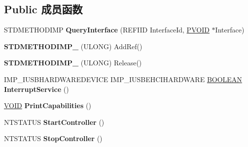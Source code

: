 \subsection*{Public 成员函数}
\begin{DoxyCompactItemize}
\item 
\mbox{\label{class_c_u_s_b_hardware_device_add03c1ce4739d30eb3120b009009b1ad}} 
S\+T\+D\+M\+E\+T\+H\+O\+D\+I\+MP {\bfseries Query\+Interface} (R\+E\+F\+I\+ID Interface\+Id, \hyperlink{interfacevoid}{P\+V\+O\+ID} $\ast$Interface)
\item 
\mbox{\label{class_c_u_s_b_hardware_device_a64dbb65e59d97d17de77e02c4d692bdb}} 
{\bfseries S\+T\+D\+M\+E\+T\+H\+O\+D\+I\+M\+P\+\_\+} (U\+L\+O\+NG) Add\+Ref()
\item 
\mbox{\label{class_c_u_s_b_hardware_device_afe685aebe72aac9ebe1e83a0af2dbd56}} 
{\bfseries S\+T\+D\+M\+E\+T\+H\+O\+D\+I\+M\+P\+\_\+} (U\+L\+O\+NG) Release()
\item 
\mbox{\label{class_c_u_s_b_hardware_device_a255f0e284d972083008882c8a552ee05}} 
I\+M\+P\+\_\+\+I\+U\+S\+B\+H\+A\+R\+D\+W\+A\+R\+E\+D\+E\+V\+I\+CE I\+M\+P\+\_\+\+I\+U\+S\+B\+E\+H\+C\+I\+H\+A\+R\+D\+W\+A\+RE \hyperlink{_processor_bind_8h_a112e3146cb38b6ee95e64d85842e380a}{B\+O\+O\+L\+E\+AN} {\bfseries Interrupt\+Service} ()
\item 
\mbox{\label{class_c_u_s_b_hardware_device_a7175ab91b141c5d488d0c64260f438c6}} 
\hyperlink{interfacevoid}{V\+O\+ID} {\bfseries Print\+Capabilities} ()
\item 
\mbox{\label{class_c_u_s_b_hardware_device_ad87dee96863b5edb6be4c5b0b61a4654}} 
N\+T\+S\+T\+A\+T\+US {\bfseries Start\+Controller} ()
\item 
\mbox{\label{class_c_u_s_b_hardware_device_a457e6a85dd887c65fda56bac77ea8d56}} 
N\+T\+S\+T\+A\+T\+US {\bfseries Stop\+Controller} ()
\item 
\mbox{\label{class_c_u_s_b_hardware_device_a84a15867f7e6a65292aef356a13c532f}} 

\end{DoxyCompactItemize}
